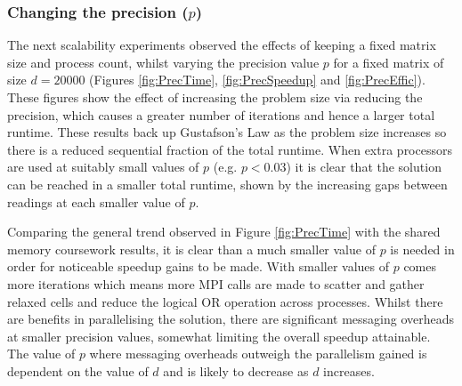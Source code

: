 \documentclass[11pt]{article}
\begin{document}
{\color{darkpurple}
\subsubsection*{Changing the precision ($p$)}}
The next scalability experiments observed the effects of keeping a fixed matrix size and process count, whilst varying the precision value $p$ for a fixed matrix of size $d=20000$ (Figures \ref{fig:PrecTime}, \ref{fig:PrecSpeedup} and \ref{fig:PrecEffic}). These figures show the effect of increasing the problem size via reducing the precision, which causes a greater number of iterations and hence a larger total runtime. These results back up Gustafson's Law as the problem size increases so there is a reduced sequential fraction of the total runtime. When extra processors are used at suitably small values of $p$ (e.g. $p < 0.03$) it is clear that the solution can be reached in a smaller total runtime, shown by the increasing gaps between readings at each smaller value of $p$.

Comparing the general trend observed in Figure \ref{fig:PrecTime} with the shared memory coursework results, it is clear than a much smaller value of $p$ is needed in order for noticeable speedup gains to be made. With smaller values of $p$ comes more iterations which means more MPI calls are made to scatter and gather relaxed cells and reduce the logical OR operation across processes. Whilst there are benefits in parallelising the solution, there are significant messaging overheads at smaller precision values, somewhat limiting the overall speedup attainable. The value of $p$ where messaging overheads outweigh the parallelism gained is dependent on the value of $d$ and is likely to decrease as $d$ increases.
\end{document}
